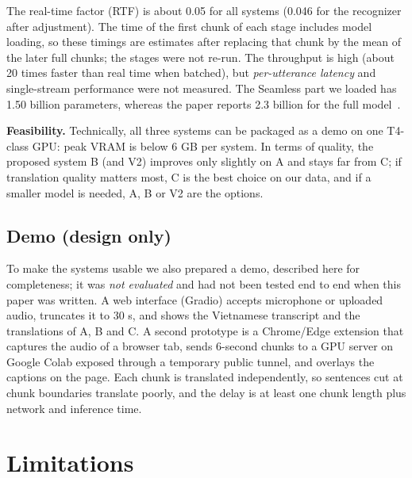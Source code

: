 \documentclass[pdflatex,sn-mathphys-num]{sn-jnl}
\begin{document}
The real-time factor (RTF) is about 0.05 for all systems (0.046 for the recognizer after adjustment). The time of the first chunk of each stage includes model loading, so these timings are estimates after replacing that chunk by the mean of the later full chunks; the stages were not re-run. The throughput is high (about 20 times faster than real time when batched), but \emph{per-utterance latency} and single-stream performance were not measured. The Seamless part we loaded has 1.50 billion parameters, whereas the paper reports 2.3 billion for the full model~\cite{seamless}.

\textbf{Feasibility.} Technically, all three systems can be packaged as a demo on one T4-class GPU: peak VRAM is below 6 GB per system. In terms of quality, the proposed system B (and V2) improves only slightly on A and stays far from C; if translation quality matters most, C is the best choice on our data, and if a smaller model is needed, A, B or V2 are the options.

\subsection{Demo (design only)}

To make the systems usable we also prepared a demo, described here for completeness; it was \emph{not evaluated} and had not been tested end to end when this paper was written. A web interface (Gradio) accepts microphone or uploaded audio, truncates it to 30 s, and shows the Vietnamese transcript and the translations of A, B and C. A second prototype is a Chrome/Edge extension that captures the audio of a browser tab, sends 6-second chunks to a GPU server on Google Colab exposed through a temporary public tunnel, and overlays the captions on the page. Each chunk is translated independently, so sentences cut at chunk boundaries translate poorly, and the delay is at least one chunk length plus network and inference time.

\section{Limitations}\label{sec:limit}
\end{document}
